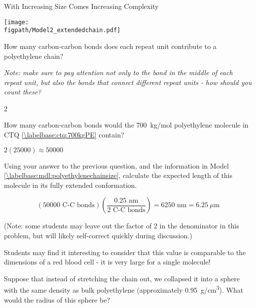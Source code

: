 \begin{activity}{With Increasing Size Comes Increasing Complexity}
\begin{model}
	\vspace{6pt}
	\centerline{\texttt{[image: \\figpath/Model2\_extendedchain.pdf]}}

\end{model}

\begin{ctqs}

	\question How many carbon-carbon bonds does each repeat unit contribute to a polyethylene chain?
	
		\emph{Note: make sure to pay attention not only to the bond in the middle of each repeat unit, but also the bonds that connect different repeat units - how should you count these?}
		
		\begin{solution}[1in]
			2
		\end{solution}
	
	\question How many carbon-carbon bonds would the 700~kg/mol polyethylene molecule in CTQ \ref{\labelbase:ctq:700kgPE} contain?
		
		\begin{solution}[1in]
			$2(25000)\approx 50000$
		\end{solution}
	
	\question Using your answer to the previous question, and the information in Model \ref{\labelbase:mdl:polyethylenechainsize}, calculate the expected length of this molecule in its fully extended conformation. \label{\labelbase:ctq:extendedPE}
		
		\begin{solution}[1.9in]
			\begin{equation*}
				\left(50000\text{ C-C bonds}\right)\left(\frac{0.25\text{ nm}}{2\text{ C-C bonds}}\right) = 6250\text{ nm} = 6.25~\mu\text{m}
			\end{equation*}
			
			(Note: some students may leave out the factor of 2 in the denominator in this problem, but will likely self-correct quickly during discussion.)
			
			Students may find it interesting to consider that this value is comparable to the dimensions of a red blood cell - it is very large for a single molecule!
		\end{solution}
	\question Suppose that instead of stretching the chain out, we collapsed it into a sphere with the same density as bulk polyethylene (approximately 0.95~g/cm\textsuperscript{3}).  What would the radius of this sphere be? \label{\labelbase:ctq:collapsedPE}
	

\end{ctqs}
\end{activity}

